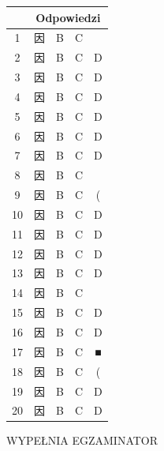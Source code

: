 \documentclass[10pt]{article}
\begin{document}
\begin{center}
\begin{tabular}{|c|c|c|c|c|}
\hline
 & \multicolumn{4}{|c|}{Odpowiedzi} \\
\hline
1 & 因 & B & C &  \\
\hline
2 & 因 & B & C & D \\
\hline
3 & 因 & B & C & D \\
\hline
4 & 因 & B & C & D \\
\hline
5 & 因 & B & C & D \\
\hline
6 & 因 & B & C & D \\
\hline
7 & 因 & B & C & D \\
\hline
8 & 因 & B & C &  \\
\hline
9 & 因 & B & C & ( \\
\hline
10 & 因 & B & C & D \\
\hline
11 & 因 & B & C & D \\
\hline
12 & 因 & B & C & D \\
\hline
13 & 因 & B & C & D \\
\hline
14 & 因 & B & C &  \\
\hline
15 & 因 & B & C & D \\
\hline
16 & 因 & B & C & D \\
\hline
17 & 因 & B & C & ■ \\
\hline
18 & 因 & B & C & ( \\
\hline
19 & 因 & B & C & D \\
\hline
20 & 因 & B & C & D \\
\hline
\end{tabular}
\end{center}

WYPEŁNIA EGZAMINATOR
\end{document}
